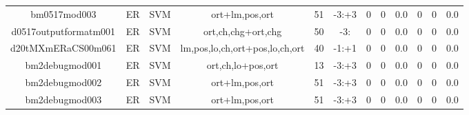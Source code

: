 \documentclass[a4paper]{article}
\begin{document}
\begin{landscape}
\begin{center}
\begin{tabular}{ |c|c|c|c|c|c|c|c|c|c|c|c|}
 
 	
 	\small{ bm0517mod003 } & ER & SVM & ort+lm,pos,ort  &  51 &  -3:+3  &  0 & 0 & 0.0  &  0 & 0 & 0.0 \\
 	

 
 	
 	\small{ d0517outputformatm001 } & ER & SVM & ort,ch,chg+ort,chg  &  50 &  -3:  &  0 & 0 & 0.0  &  0 & 0 & 0.0 \\
 	

 
 	
 	\small{ d20tMXmERaCS00m061 } & ER & SVM & lm,pos,lo,ch,ort+pos,lo,ch,ort  &  40 &  -1:+1  &  0 & 0 & 0.0  &  0 & 0 & 0.0 \\
 	

 
 	
 	\small{ bm2debugmod001 } & ER & SVM & ort,ch,lo+pos,ort  &  13 &  -3:+3  &  0 & 0 & 0.0  &  0 & 0 & 0.0 \\
 	

 
 	
 	\small{ bm2debugmod002 } & ER & SVM & ort+lm,pos,ort  &  51 &  -3:+3  &  0 & 0 & 0.0  &  0 & 0 & 0.0 \\
 	

 
 	
 	\small{ bm2debugmod003 } & ER & SVM & ort+lm,pos,ort  &  51 &  -3:+3  &  0 & 0 & 0.0  &  0 & 0 & 0.0 \\
 	

 
 \hline
\end{tabular}
\end{center}

\end{landscape}
\end{document}
